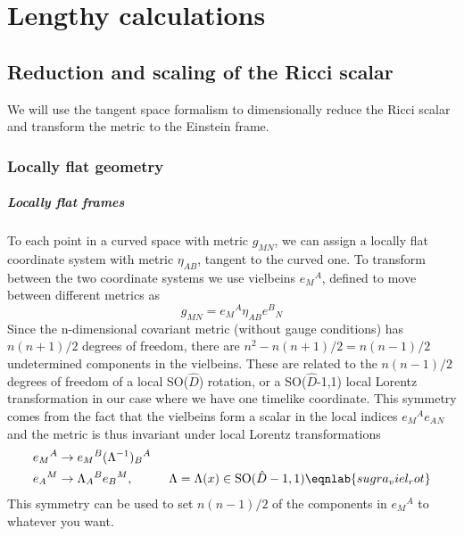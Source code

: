 \chapter{Lengthy calculations}
\section{Reduction and scaling of the Ricci scalar}
We will use the tangent space formalism to dimensionally reduce the Ricci scalar and transform the metric to the Einstein frame. 

\subsection{Locally flat geometry}
\paragraph{Locally flat frames}
To each point in a curved space with metric $g_{MN}$, we can assign a locally flat coordinate system with metric $\eta_{AB}$, tangent to the curved one. To transform between the two coordinate systems we use vielbeins $e{_M}^A$, defined to move between different metrics as
\begin{equation}
g_{MN} = e{_M}^A \eta_{AB} e{^B}{_N} 
\end{equation}
Since the n-dimensional covariant metric (without gauge conditions) has $n(n+1)/2$ degrees of freedom, there are $n^2-n(n+1)/2=n(n-1)/2$ undetermined components in the vielbeins.
These are related to the $n(n-1)/2$ degrees of freedom of a local SO($\hat D$) rotation, or a SO($\hat D$-1,1) local Lorentz transformation in our case where we have one timelike coordinate.  
This symmetry comes from the fact that the vielbeins form a scalar in the local indices $e{_M}^Ae{_A}{_N}$ and the metric is thus invariant under local Lorentz transformations
\begin{align}
e{_M}^A &\rightarrow e{_M}^B(\Lambda^{-1}){_B}^A\hspace{1cm} \nonumber\\ 
e{_A}^M &\rightarrow \Lambda{_A}^Be{_B}^M,\hspace{1cm} \Lambda = \Lambda(x)\in \mbox{SO}(\hat D-1,1)
\eqnlab{sugra_viel_rot}
\end{align}
This symmetry can be used to set $n(n-1)/2$ of the components in $e{_M}^A$ to whatever you want. 

